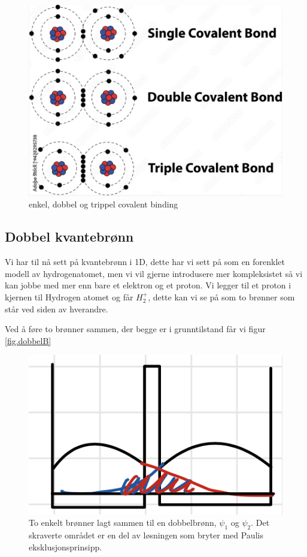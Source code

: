 \begin{figure}[!htb]
    \centering
    \includegraphics[scale=0.3]{Bilder/SamtaleTema3/Bindinger/covalent.png}
    \caption{enkel, dobbel og trippel covalent binding}
    \label{fig:cov}
\end{figure}

\subsection{Dobbel kvantebrønn}
\label{sec:tema3_7}
Vi har til nå sett på kvantebrønn i 1D, dette har vi sett på som en forenklet modell av hydrogenatomet, men vi vil gjerne introdusere mer kompleksistet så vi kan jobbe med mer enn bare et elektron og et proton. Vi legger til et proton i kjernen til Hydrogen atomet og får $H_2^+$, dette kan vi se på som to brønner som står ved siden av hverandre. 

Ved å føre to brønner sammen, der begge er i grunntilstand får vi figur \ref{fig.dobbelB}

\begin{figure}[!htb]
    \centering
    \includegraphics[scale=1]{Bilder/SamtaleTema3/DobbelBrønn/dobbelBrønn.png}
    \caption{To enkelt brønner lagt sammen til en dobbelbrønn, $\psi_1$ og $\psi_2$. Det skraverte området er en del av løsningen som bryter med Paulis eksklusjonsprinsipp.}
    \label{fig:dobbelB}
\end{figure}

